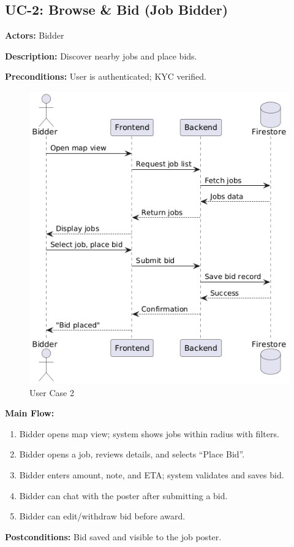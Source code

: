 \documentclass[11pt]{article}
\begin{document}
\subsection{UC-2: Browse \& Bid (Job Bidder)}
\textbf{Actors:} Bidder \par
\textbf{Description:} Discover nearby jobs and place bids. \par
\textbf{Preconditions:} User is authenticated; KYC verified. \par
\begin{figure}[h]
  \centering
\includegraphics[width=0.9\linewidth]{UC-2.png}
  \caption{User Case 2}
\end{figure} \par
\textbf{Main Flow:}
\begin{enumerate}[leftmargin=1.4em]
  \item Bidder opens map view; system shows jobs within radius with filters.
  \item Bidder opens a job, reviews details, and selects ``Place Bid''.
  \item Bidder enters amount, note, and ETA; system validates and saves bid.
  \item Bidder can chat with the poster after submitting a bid.
  \item Bidder can edit/withdraw bid before award.
\end{enumerate}
\textbf{Postconditions:} Bid saved and visible to the job poster.
\end{document}
